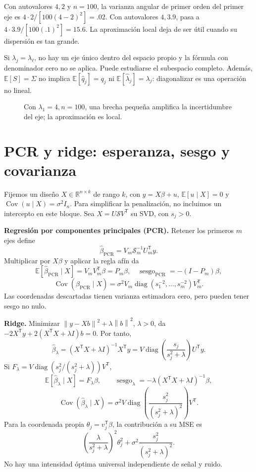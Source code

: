 \documentclass[11pt,a4paper]{article}
\newcommand{\R}{\mathbb R}
\newcommand{\E}{\mathbb E}
\newcommand{\T}{^{\mathsf T}}
\newcommand{\norm}[1]{\left\lVert #1\right\rVert}
\DeclareMathOperator{\Cov}{Cov}
\DeclareMathOperator{\diag}{diag}
\newcommand{\topic}[2]{\clearpage\section{#1}\label{#2}}
\theoremstyle{definition}\newtheorem{definicion}[teorema]{Definición}
\begin{document}
\begin{ejemplo}
Con autovalores $4,2$ y $n=100$, la varianza angular de primer orden
del primer eje es $4\cdot2/[100(4-2)^2]=.02$.
Con autovalores $4,3.9$, pasa a
$4\cdot3.9/[100(.1)^2]=15.6$.
La aproximación local deja de ser útil cuando su dispersión es tan grande.
\end{ejemplo}
\begin{cuidado}
Si $\lambda_j=\lambda_\ell$, no hay un eje único dentro del espacio propio
y la fórmula con denominador cero no se aplica. Puede estudiarse el
subespacio completo. Además, $\E[S]=\Sigma$ no implica
$\E[\widehat q_j]=q_j$ ni $\E[\widehat\lambda_j]=\lambda_j$:
diagonalizar es una operación no lineal.
\end{cuidado}

\begin{figure}[H]\centering
{}
\caption{Con $\lambda_1=4,n=100$, una brecha pequeña amplifica la incertidumbre del eje; la aproximación es local.}
\end{figure}
\topic{PCR y ridge: esperanza, sesgo y covarianza}{s32}
Fijemos un diseño $X\in\R^{n\times k}$ de rango $k$, con
$y=X\beta+u$, $\E[u\mid X]=0$ y $\Cov(u\mid X)=\sigma^2I_n$.
Para simplificar la penalización, no incluimos un intercepto en este bloque.
Sea $X=U\mathcal S V\T$ su SVD, con $s_j>0$.

\textbf{Regresión por componentes principales (PCR).}
Retener los primeros $m$ ejes define
\[
\widehat\beta_{\mathrm{PCR}}
=V_m\mathcal S_m^{-1}U_m\T y.
\]
Multiplicar por $X\beta$ y aplicar la regla afín da
\[
\E[\widehat\beta_{\mathrm{PCR}}\mid X]=V_mV_m\T\beta=P_m\beta,
\quad
\operatorname{sesgo}_{\mathrm{PCR}}=-(I-P_m)\beta,
\]
\[
\boxed{\Cov(\widehat\beta_{\mathrm{PCR}}\mid X)
=\sigma^2V_m\diag(s_1^{-2},\ldots,s_m^{-2})V_m\T}.
\]
Las coordenadas descartadas tienen varianza estimadora cero, pero
pueden tener sesgo no nulo.

\textbf{Ridge.} Minimizar $\norm{y-Xb}^2+\lambda\norm b^2$, $\lambda>0$,
da $-2X\T y+2(X\T X+\lambda I)b=0$. Por tanto,
\[
\widehat\beta_\lambda=(X\T X+\lambda I)^{-1}X\T y
=V\diag\!\left(\frac{s_j}{s_j^2+\lambda}\right)U\T y.
\]
Si $F_\lambda=V\diag(s_j^2/(s_j^2+\lambda))V\T$,
\[
\E[\widehat\beta_\lambda\mid X]=F_\lambda\beta,\qquad
\operatorname{sesgo}_\lambda=-\lambda(X\T X+\lambda I)^{-1}\beta,
\]
\[
\boxed{\Cov(\widehat\beta_\lambda\mid X)
=\sigma^2V\diag\!\left(\frac{s_j^2}{(s_j^2+\lambda)^2}\right)V\T}.
\]
Para la coordenada propia $\theta_j=v_j\T\beta$, la contribución a su MSE es
\[
\left(\frac{\lambda}{s_j^2+\lambda}\right)^2\theta_j^2+
\sigma^2\frac{s_j^2}{(s_j^2+\lambda)^2}.
\]
No hay una intensidad óptima universal independiente de señal y ruido.
\end{document}
